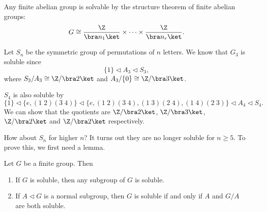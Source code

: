 \documentclass[a4paper]{article}
\begin{document}
\begin{eg}
  Any finite abelian group is solvable by the structure theorem of finite abelian groups:
  \[
    G \cong \frac{\Z}{\bra n_1\ket} \times \cdots \times \frac{\Z}{\bra n_r\ket}.
  \]
\end{eg}

\begin{eg}
  Let $S_n$ be the symmetric group of permutations of $n$ letters. We know that $G_3$ is soluble since
  \[
    \{1\} \lhd A_3 \lhd S_3,
  \]
  where $S_3/A_3 \cong \Z/\bra 2\ket$ and $A_3/\{0\} \cong \Z/\bra 3\ket$.

  $S_4$ is also soluble by
  \[
    \{1\} \lhd \{e, (1\; 2)(3\; 4)\} \lhd \{e, (1\; 2)(3\; 4), (1\; 3)(2\; 4), (1\; 4)(2\; 3)\} \lhd A_4 \lhd S_4.
  \]
  We can show that the quotients are $\Z/\bra 2\ket$, $\Z/\bra 3\ket$, $\Z/\bra 2\ket$ and $\Z/\bra 2\ket$ respectively.
\end{eg}
How about $S_n$ for higher $n$? It turns out they are no longer soluble for $n \geq 5$. To prove this, we first need a lemma.

\begin{lemma}
  Let $G$ be a finite group. Then
  \begin{enumerate}
    \item If $G$ is soluble, then any subgroup of $G$ is soluble.
    \item If $A \lhd G$ is a normal subgroup, then $G$ is soluble if and only if $A$ and $G/A$ are both soluble.
  \end{enumerate}
\end{lemma}
\end{document}
